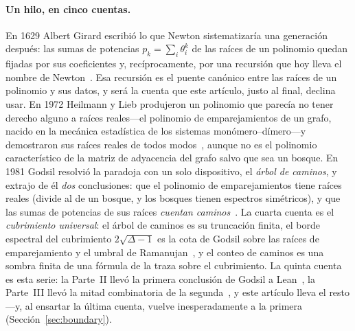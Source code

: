 \documentclass[11pt]{article}
\begin{document}
\paragraph{Un hilo, en cinco cuentas.} En 1629 Albert Girard escribi\'o lo que Newton
sistematizar\'ia una generaci\'on despu\'es: las sumas de potencias $p_k=\sum_i\theta_i^k$ de las
ra\'ices de un polinomio quedan fijadas por sus coeficientes y, rec\'iprocamente, por una recursi\'on
que hoy lleva el nombre de Newton~\cite{Girard,Macdonald}. Esa recursi\'on es el puente can\'onico
entre las ra\'ices de un polinomio y sus datos, y ser\'a la cuenta que este art\'iculo, justo al final,
declina usar. En 1972 Heilmann y Lieb produjeron un polinomio que parec\'ia no tener derecho alguno a
ra\'ices reales---el polinomio de emparejamientos de un grafo, nacido en la mec\'anica estad\'istica de
los sistemas mon\'omero--d\'imero---y demostraron sus ra\'ices reales de todos
modos~\cite{HeilmannLieb}, aunque no es el polinomio caracter\'istico de la matriz de adyacencia del
grafo salvo que sea un bosque. En 1981 Godsil resolvi\'o la paradoja con un solo dispositivo, el
\emph{\'arbol de caminos}, y extrajo de \'el \emph{dos} conclusiones: que el polinomio de
emparejamientos tiene ra\'ices reales (divide al de un bosque, y los bosques tienen espectros
sim\'etricos), y que las sumas de potencias de sus ra\'ices \emph{cuentan
caminos}~\cite{Godsil1981a,GodsilBook}. La cuarta cuenta es el \emph{cubrimiento universal}: el
\'arbol de caminos es su truncaci\'on finita, el borde espectral del cubrimiento $2\sqrt{\Delta-1}$ es
la cota de Godsil sobre las ra\'ices de emparejamiento y el umbral de
Ramanujan~\cite{AngelFriedmanHoory,McKay,MSS}, y el conteo de caminos es una sombra finita de una
f\'ormula de la traza sobre el cubrimiento. La quinta cuenta es esta serie: la Parte~II llev\'o la
primera conclusi\'on de Godsil a Lean~\cite{PartII}, la Parte~III llev\'o la mitad combinatoria de la
segunda~\cite{PartIII}, y este art\'iculo lleva el resto---y, al ensartar la \'ultima cuenta, vuelve
inesperadamente a la primera (Secci\'on~\ref{sec:boundary}).
\end{document}
